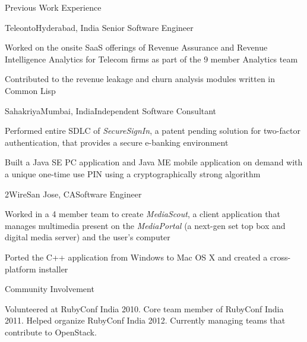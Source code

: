 \documentclass{resume} %
\begin{document}
\begin{rSection}{Previous Work Experience}

\begin{rSubsection}{Teleonto}{Hyderabad, India}{}{}
{Senior Software Engineer}
\item Worked on the onsite SaaS offerings of Revenue Assurance and Revenue Intelligence Analytics for Telecom firms as part of the 9 member Analytics team
\item Contributed to the revenue leakage and churn analysis modules written in Common Lisp
\end{rSubsection}


\begin{rSubsection}{Sahakriya}{Mumbai, India}{}{}{Independent Software Consultant}
\item Performed entire SDLC of {\em SecureSignIn}, a patent pending solution for two-factor authentication, that provides a secure e-banking environment
\item Built a Java SE PC application and Java ME mobile application on demand with a unique one-time use PIN using a cryptographically strong algorithm
\end{rSubsection}


\begin{rSubsection}{2Wire}{San Jose, CA}{}{}{Software Engineer}
\item Worked in a 4 member team to create {\em MediaScout}, a client
  application that manages multimedia present on the {\em MediaPortal}
  (a next-gen set top box and digital media server) and the user's computer
\item Ported the C++ application from Windows to Mac OS X and created a cross-platform installer
\end{rSubsection}

\end{rSection}


\begin{rSection}{Community Involvement}

Volunteered at RubyConf India 2010. Core team member of RubyConf India 2011. Helped organize RubyConf India 2012. Currently managing teams that contribute to OpenStack.
\end{rSection}
\end{document}
